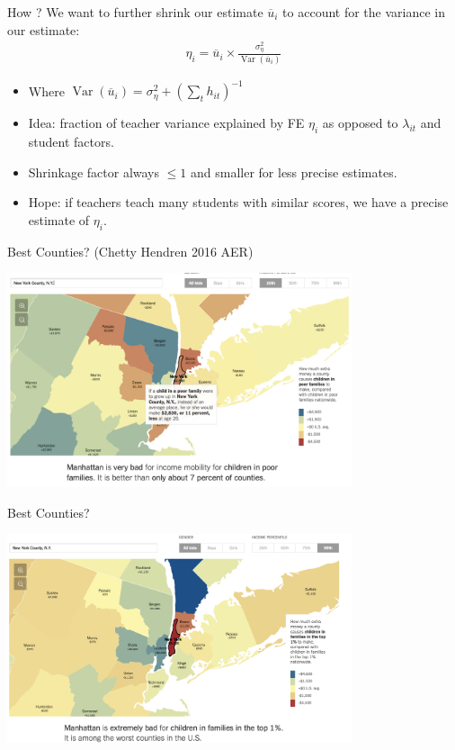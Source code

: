 \documentclass[xcolor=pdftex,dvipsnames,table,mathserif,aspectratio=169]{beamer}
\begin{document}
\begin{frame}{How ?}
We want to further shrink our estimate $\overline{u}_{i}$ to account for the variance in our estimate:
\begin{align*}
\eta_i = \overline{u}_i \times \frac{\sigma_{\eta}^2}{\operatorname{Var} (\overline{u}_{i} )}
\end{align*}
\begin{itemize}
\item Where $\operatorname{Var} (\overline{u}_{i} )= \sigma_{\eta}^2 + \left(\sum_t h_{it} \right)^{-1} $
\item Idea: fraction of teacher variance explained by FE $\eta_i$ as opposed to $\lambda_{it}$ and student factors.
\item Shrinkage factor always $\leq 1$ and smaller for less precise estimates.
\item Hope: if teachers teach many students with similar scores, we have a precise estimate of $\eta_i$.
\end{itemize}
\end{frame}



\begin{frame}{Best Counties? (Chetty Hendren 2016 AER)}
\begin{center}
\includegraphics[width=4in]{./resources/chetty2.png}
\end{center}
\end{frame}


\begin{frame}{Best Counties?}
\begin{center}
\includegraphics[width=4in]{./resources/chetty3.png}
\end{center}
\end{frame}
\end{document}
